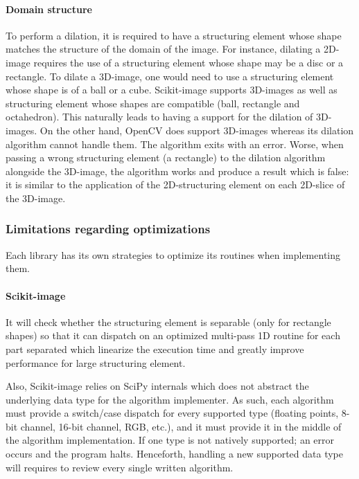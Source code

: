 \paragraph{Domain structure} To perform a dilation, it is required to have a structuring element whose shape matches the
structure of the domain of the image. For instance, dilating a 2D-image requires the use of a structuring element whose
shape may be a disc or a rectangle. To dilate a 3D-image, one would need to use a structuring element whose shape is of
a ball or a cube. Scikit-image supports 3D-images as well as structuring element whose shapes are compatible (ball,
rectangle and octahedron). This naturally leads to having a support for the dilation of 3D-images. On the other hand,
OpenCV does support 3D-images whereas its dilation algorithm cannot handle them. The algorithm exits with an error.
Worse, when passing a wrong structuring element (a rectangle) to the dilation algorithm alongside the 3D-image, the
algorithm works and produce a result which is false: it is similar to the application of the 2D-structuring element on
each 2D-slice of the 3D-image.


\subsubsection{Limitations regarding optimizations}

Each library has its own strategies to optimize its routines when implementing them.

\paragraph{Scikit-image} It will check whether the structuring element is separable (only for rectangle shapes) so that
it can dispatch on an optimized multi-pass 1D routine for each part separated which linearize the execution time and
greatly improve performance for large structuring element.

Also, Scikit-image relies on SciPy internals which does not abstract the underlying data type for the algorithm
implementer. As such, each algorithm must provide a switch/case dispatch for every supported type (floating points,
8-bit channel, 16-bit channel, RGB, etc.), and it must provide it in the middle of the algorithm implementation. If one
type is not natively supported; an error occurs and the program halts. Henceforth, handling a new supported data type
will requires to review every single written algorithm.


